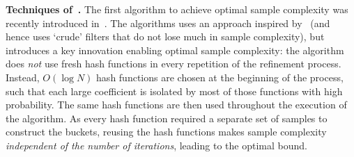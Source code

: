 

{\bf Techniques of~\cite{IK14a}.} The first algorithm to achieve optimal sample complexity was recently introduced in~\cite{IK14a}.  The algorithms uses an approach inspired by~\cite{GMS} (and hence uses `crude' filters that do not lose much in sample complexity), but introduces a key innovation enabling optimal sample complexity: the algorithm does {\em not} use fresh hash functions in every repetition of the refinement process. Instead, $O(\log N)$ hash functions are chosen at the beginning of the process, such that each large coefficient is isolated by most of those functions with high probability.  The same hash functions are then used throughout the execution of the algorithm. As every hash function required a separate set of samples to construct the buckets, reusing the hash functions makes sample complexity {\em independent of the number of iterations}, leading to the optimal bound. 
 
